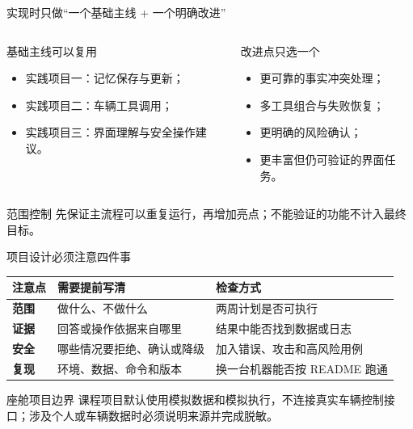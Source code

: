 \begin{frame}{实现时只做“一个基础主线 + 一个明确改进”}
  \begin{columns}[T,onlytextwidth]
      \begin{block}{基础主线可以复用}
        \begin{itemize}
          \item 实践项目一：记忆保存与更新；
          \item 实践项目二：车辆工具调用；
          \item 实践项目三：界面理解与安全操作建议。
        \end{itemize}
      \end{block}
      \begin{block}{改进点只选一个}
        \begin{itemize}
          \item 更可靠的事实冲突处理；
          \item 多工具组合与失败恢复；
          \item 更明确的风险确认；
          \item 更丰富但仍可验证的界面任务。
        \end{itemize}
      \end{block}
  \end{columns}
  \begin{alertblock}{范围控制}
    先保证主流程可以重复运行，再增加亮点；不能验证的功能不计入最终目标。
  \end{alertblock}
\end{frame}

\begin{frame}{项目设计必须注意四件事}
  \small
  \begin{tabularx}{\textwidth}{>{\bfseries}p{2.3cm} X X}
    \toprule
    注意点 & 需要提前写清 & 检查方式 \\
    \midrule
    范围 & 做什么、不做什么 & 两周计划是否可执行 \\
    证据 & 回答或操作依据来自哪里 & 结果中能否找到数据或日志 \\
    安全 & 哪些情况要拒绝、确认或降级 & 加入错误、攻击和高风险用例 \\
    复现 & 环境、数据、命令和版本 & 换一台机器能否按 README 跑通 \\
    \bottomrule
  \end{tabularx}
  \begin{alertblock}{座舱项目边界}
    课程项目默认使用模拟数据和模拟执行，不连接真实车辆控制接口；涉及个人或车辆数据时必须说明来源并完成脱敏。
  \end{alertblock}
\end{frame}

